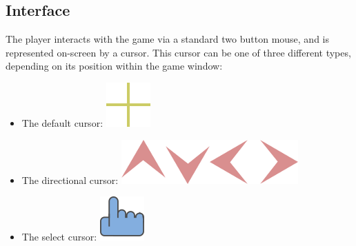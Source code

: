 \documentclass{article}
\begin{document}
	\subsection{Interface}
		The player interacts with the game via a standard two button mouse, and is represented on-screen by a cursor. This cursor can be one of three different types, depending on its position within the game window:
		\begin{itemize}
			\item The default cursor: \includegraphics[scale=0.2]{UMimages/Default}
			\item The directional cursor: \includegraphics[scale=0.2]{UMimages/Up}\includegraphics[scale=0.2]{UMimages/Down}\includegraphics[scale=0.2]{UMimages/Left}\includegraphics[scale=0.2]{UMimages/Right}
			\item The select cursor: \includegraphics[scale=0.04]{UMimages/Select}
		\end{itemize}
\end{document}
